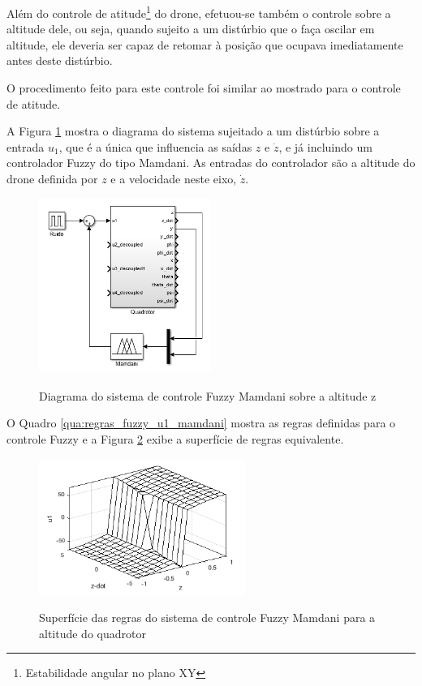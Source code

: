 Além do controle de atitude\footnote{Estabilidade angular no plano XY} do drone, efetuou-se também o controle sobre a altitude dele, ou seja, quando sujeito a um distúrbio que o faça oscilar em altitude, ele deveria ser capaz de retomar à posição que ocupava imediatamente antes deste distúrbio.

O procedimento feito para este controle foi similar ao mostrado para o controle de atitude.

A Figura \ref{fig:u1_mamdani_blocks} mostra o diagrama do sistema sujeitado a um distúrbio sobre a entrada $u_1$, que é a única que influencia as saídas $z$ e $\dot{z}$, e já incluindo um controlador Fuzzy do tipo Mamdani. As entradas do controlador são a altitude do drone definida por $z$ e a velocidade neste eixo, $\dot{z}$.

\begin{figure}[!htb]
    \centering
    \caption{Diagrama do sistema de controle Fuzzy Mamdani sobre a altitude z}
    \includegraphics[width=0.5\textwidth]{./04-figuras/resultados/fis_u1/u1_mamdani_blocks}
    \label{fig:u1_mamdani_blocks}
\end{figure}

O Quadro \ref{qua:regras_fuzzy_u1_mamdani} mostra as regras definidas para o controle Fuzzy e a Figura \ref{fig:1_mamdani_surface} exibe a superfície de regras equivalente.



\begin{figure}[!htb]
    \centering
    \caption{Superfície das regras do sistema de controle Fuzzy Mamdani para a altitude do quadrotor}
    \includegraphics[width=0.6\textwidth]{./04-figuras/resultados/fis_u1/u1_mamdani_surface}
    \label{fig:1_mamdani_surface}
\end{figure}

